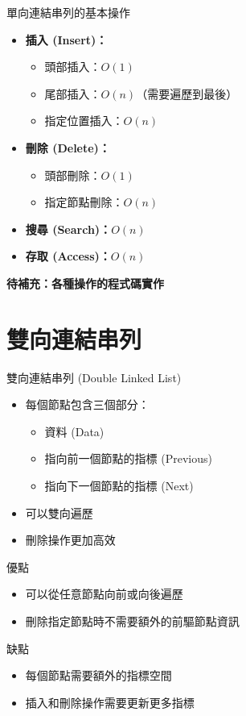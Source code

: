 \documentclass{beamer}
\begin{document}
\begin{frame}{單向連結串列的基本操作}
\begin{itemize}
    \item \textbf{插入 (Insert)：}
    \begin{itemize}
        \item 頭部插入：$O(1)$
        \item 尾部插入：$O(n)$（需要遍歷到最後）
        \item 指定位置插入：$O(n)$
    \end{itemize}
    \item \textbf{刪除 (Delete)：}
    \begin{itemize}
        \item 頭部刪除：$O(1)$
        \item 指定節點刪除：$O(n)$
    \end{itemize}
    \item \textbf{搜尋 (Search)：}$O(n)$
    \item \textbf{存取 (Access)：}$O(n)$
\end{itemize}

\vspace{1em}
\textbf{待補充：各種操作的程式碼實作}
\end{frame}

\section{雙向連結串列}

\begin{frame}{雙向連結串列 (Double Linked List)}
\begin{itemize}
    \item 每個節點包含三個部分：
    \begin{itemize}
        \item 資料 (Data)
        \item 指向前一個節點的指標 (Previous)
        \item 指向下一個節點的指標 (Next)
    \end{itemize}
    \item 可以雙向遍歷
    \item 刪除操作更加高效
\end{itemize}

\vspace{1em}
\begin{block}{優點}
\begin{itemize}
    \item 可以從任意節點向前或向後遍歷
    \item 刪除指定節點時不需要額外的前驅節點資訊
\end{itemize}
\end{block}

\vspace{1em}
\begin{block}{缺點}
\begin{itemize}
    \item 每個節點需要額外的指標空間
    \item 插入和刪除操作需要更新更多指標
\end{itemize}
\end{block}
\end{frame}
\end{document}
